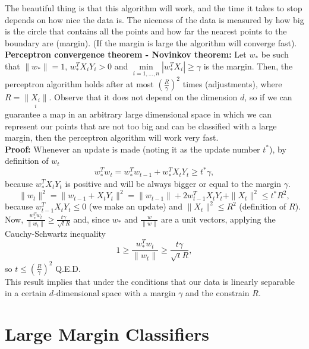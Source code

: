\documentclass[11pt, english]{article}
\begin{document}
The beautiful thing is that this algorithm will work, and the time it takes to stop depends on how nice the data is. The niceness of the data is measured by how big is the circle that contains all the points and how far the nearest points to the boundary are (margin). (If the margin is large the algorithm will converge fast).\\

\textbf{Perceptron convergence theorem - Novinkov theorem: }Let $w_*$ be such that $\|w_*\|=1$, $w_*^TX_iY_i>0$ and $\underset{i=1,\dots,n}{\min}|w_*^TX_i|\geq\gamma$ is the margin. Then, the perceptron algorithm holds after at most $\left(\frac{R}{\gamma}\right)^2$ times (adjustments), where $R=\underset{i}{\|X_i\|}$. Observe that it does not depend on the dimension $d$, so if we can guarantee a map in an arbitrary large dimensional space in which we can represent our points that are not too big and can be classified with a large margin, then the perceptron algorithm will work very fast.\\

\textbf{Proof:} Whenever an update is made (noting it as the update number $t^*$), by definition of $w_t$
\begin{equation}
	w_*^Tw_t= w_*^Tw_{t-1} + w_*^TX_tY_t\geq t^*\gamma,	
\end{equation}
because $w_*^TX_tY_t$ is positive and will be always bigger or equal to the margin $\gamma$.
\begin{equation}
	\|w_t\|^2=\|w_{t-1}+X_tY_t\|^2=\|w_{t-1}\|+2w_{t-1}^TX_tY_t+\|X_t\|^2\leq t^*R^2,
\end{equation} 
because $w_{t-1}^TX_tY_t\leq 0$ (we make an update) and $\|X_t\|^2\leq R^2$ (definition of $R$). Now, $\frac{w_*^Tw_t}{\|w_t\|}\geq \frac{t \gamma}{\sqrt{t}R}$ and, since $w_*$ and $\frac{w}{\|w\|}$ are a unit vectors, applying the Cauchy-Schwartz inequality 
\begin{equation}
	1\geq \frac{w_*^Tw_t}{\|w_t\|}\geq \frac{t \gamma}{\sqrt{t}R},
\end{equation} 
so $t\leq\left(\frac{R}{\gamma}\right)^2$ Q.E.D.\\

This result implies that under the conditions that our data is linearly separable in a certain $d$-dimensional space with a margin $\gamma$ and the constrain $R$.

 \section{Large Margin Classifiers}
 
\end{document}
